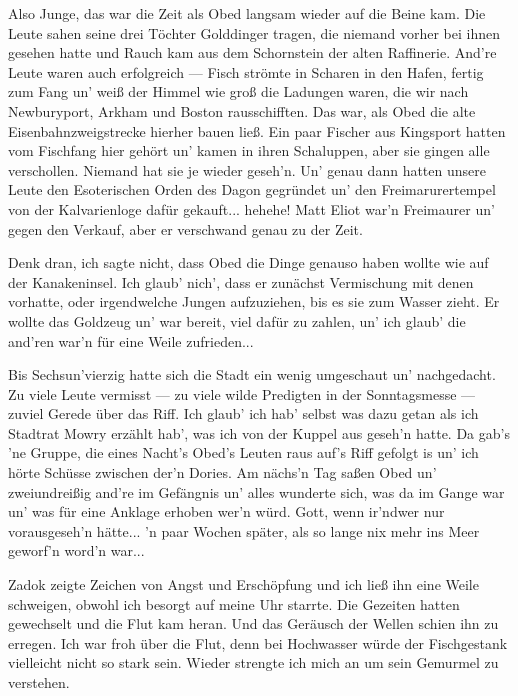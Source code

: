 Also Junge, das war die Zeit als Obed langsam wieder auf die Beine kam. Die Leute sahen seine drei Töchter Golddinger tragen, die niemand vorher bei ihnen gesehen hatte und Rauch kam aus dem Schornstein der alten Raffinerie. And're Leute waren auch erfolgreich --- Fisch strömte in Scharen in den Hafen, fertig zum Fang un' weiß der Himmel wie groß die Ladungen waren, die wir nach Newburyport, Arkham und Boston rausschifften. Das war, als Obed die alte Eisenbahnzweigstrecke hierher bauen ließ. Ein paar Fischer aus Kingsport hatten vom Fischfang hier gehört un' kamen in ihren Schaluppen, aber sie gingen alle verschollen. Niemand hat sie je wieder geseh'n. Un' genau dann hatten unsere Leute den Esoterischen Orden des Dagon gegründet un' den Freimarurertempel von der Kalvarienloge dafür gekauft... hehehe! Matt Eliot war'n Freimaurer un' gegen den Verkauf, aber er verschwand genau zu der Zeit.

Denk dran, ich sagte nicht, dass Obed die Dinge genauso haben wollte wie auf der Kanakeninsel. Ich glaub' nich', dass er zunächst Vermischung mit denen vorhatte, oder irgendwelche Jungen aufzuziehen, bis es sie zum Wasser zieht. Er wollte das Goldzeug un' war bereit, viel dafür zu zahlen, un' ich glaub' die and'ren war'n für eine Weile zufrieden...

Bis Sechsun'vierzig hatte sich die Stadt ein wenig umgeschaut un' nachgedacht. Zu viele Leute vermisst --- zu viele wilde Predigten in der Sonntagsmesse --- zuviel Gerede über das Riff. Ich glaub' ich hab' selbst was dazu getan als ich Stadtrat Mowry erzählt hab', was ich von der Kuppel aus geseh'n hatte. Da gab's 'ne Gruppe, die eines Nacht's Obed's Leuten raus auf's Riff gefolgt is un' ich hörte Schüsse zwischen der'n Dories. Am nächs'n Tag saßen Obed un' zweiundreißig and're im Gefängnis un' alles wunderte sich, was da im Gange war un' was für eine Anklage erhoben wer'n würd. Gott, wenn ir'ndwer nur vorausgeseh'n hätte... 'n paar Wochen später, als so lange nix mehr ins Meer geworf'n word'n war...\grqq

Zadok zeigte Zeichen von Angst und Erschöpfung und ich ließ ihn eine Weile schweigen, obwohl ich besorgt auf meine Uhr starrte. Die Gezeiten hatten gewechselt und die Flut kam heran. Und das Geräusch der Wellen schien ihn zu erregen. Ich war froh über die Flut, denn bei Hochwasser würde der Fischgestank vielleicht nicht so stark sein. Wieder strengte ich mich an um sein Gemurmel zu verstehen.

